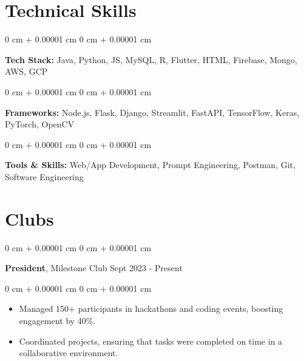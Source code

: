 \documentclass[11pt, letterpaper]{article}
\newenvironment{highlights}{
    \begin{itemize}[
        topsep=0.10 cm,
        parsep=0.10 cm,
        partopsep=0pt,
        itemsep=0pt,
        leftmargin=0 cm + 10pt
    ]
}{
    \end{itemize}
} %
\newenvironment{onecolentry}{
    \begin{adjustwidth}{
        0 cm + 0.00001 cm
    }{
        0 cm + 0.00001 cm
    }
}{
    \end{adjustwidth}
} %
\newenvironment{twocolentry}[2][]{
    \onecolentry
    \def\secondColumn{#2}
    \setcolumnwidth{\fill, 4.5 cm}
    \begin{paracol}{2}
}{
    \switchcolumn \raggedleft \secondColumn
    \end{paracol}
    \endonecolentry
} %
\begin{document}
    
    \section{Technical Skills}
        \begin{onecolentry}
            \textbf{Tech Stack:} Java, Python, JS, MySQL, R, Flutter, HTML, Firebase, Mongo, AWS, GCP \end{onecolentry}

        \vspace{0.1 cm}

        \begin{onecolentry}
            \textbf{Frameworks:} Node.js, Flask, Django, Streamlit, FastAPI, TensorFlow, Keras, PyTorch, OpenCV \end{onecolentry}   
        \vspace{0.1 cm}            
            \begin{onecolentry}
            \textbf{Tools \& Skills:} Web/App Development, Prompt Engineering, Postman, Git, Software Engineering \end{onecolentry}


    

    \section{Clubs}
        \begin{twocolentry}{
            Sept 2023 - Present
        }
            \textbf{President}, Milestone Club \end{twocolentry}

        \vspace{0.10 cm}
        \begin{onecolentry}
            \begin{highlights}
                \item Managed 150+ participants in hackathons and coding events, boosting engagement by 40\%.
                \item Coordinated projects, ensuring that tasks were completed on time in a collaborative environment.
            \end{highlights}
        \end{onecolentry}
\end{document}
